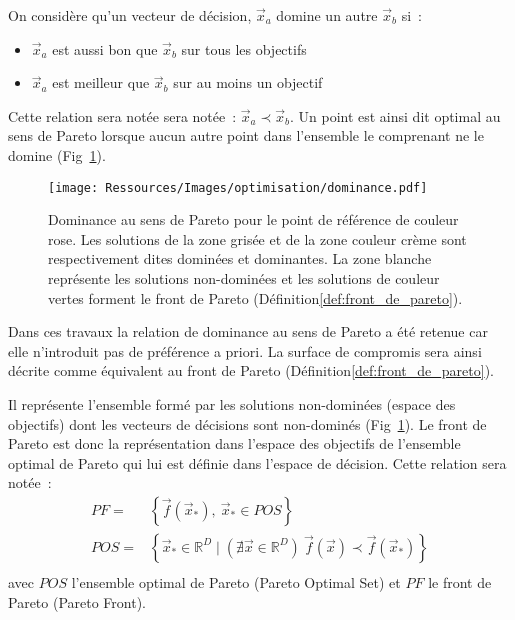 \begin{Def}\label{def:dominance_de_pareto}
On considère qu’un vecteur de décision, $\vec{x}_{a}$ domine un autre $\vec{x}_{b}$ si~:
\begin{itemize}
  \item $\vec{x}_{a}$ est aussi bon que $\vec{x}_{b}$ sur tous les objectifs
  \item $\vec{x}_{a}$ est meilleur que $\vec{x}_{b}$ sur au moins un objectif
\end{itemize}
Cette relation sera notée sera notée~: $\vec{x}_{a} \prec \vec{x}_{b}$.
Un point est ainsi dit optimal au sens de Pareto lorsque aucun autre point dans
l’ensemble le comprenant ne le domine (Fig~\ref{fig:dominance_pareto}).
\end{Def}

\begin{figure}
    \begin{center}
        \texttt{[image: Ressources/Images/optimisation/dominance.pdf]}
    \end{center}
    \caption{Dominance au sens de Pareto pour le point de référence de couleur rose.
             Les solutions de la zone grisée et de la zone couleur crème sont respectivement
             dites dominées et dominantes. La zone blanche représente les solutions
             non-dominées et les solutions de couleur vertes forment le front de
             Pareto (Définition\ref{def:front_de_pareto}).
             \label{fig:dominance_pareto}}
\end{figure}

Dans ces travaux la relation de dominance au sens de Pareto a été retenue car
elle n’introduit pas de préférence a priori. La surface de compromis sera ainsi
décrite comme équivalent au front de Pareto (Définition\ref{def:front_de_pareto}).


\begin{Def}\label{def:front_de_pareto}
Il représente l’ensemble formé par les solutions non-dominées (espace des objectifs)
dont les vecteurs de décisions sont non-dominés (Fig~\ref{fig:dominance_pareto}).
Le front de Pareto est donc la représentation dans l’espace des objectifs
de l’ensemble optimal de Pareto qui lui est définie dans l’espace de décision.
Cette relation sera notée~:
\begin{equation}
  \begin{aligned}
    PF   =& \left\{ \vec{f}(\vec{x}_{*}), \  \vec{x}_{*} \in POS \right\} \\
    POS  =& \left\{ \vec{x}_{*} \in \mathbb{R}^{D} \mid (\nexists \vec{x} \in
            \mathbb{R}^{D}) \  \vec{f}(\vec{x}) \prec \vec{f}(\vec{x}_{*}) \right\} \\
  \end{aligned}
\end{equation}
avec $POS$ l’ensemble optimal de Pareto (Pareto Optimal Set) et $PF$ le front de
Pareto (Pareto Front).
\end{Def}


